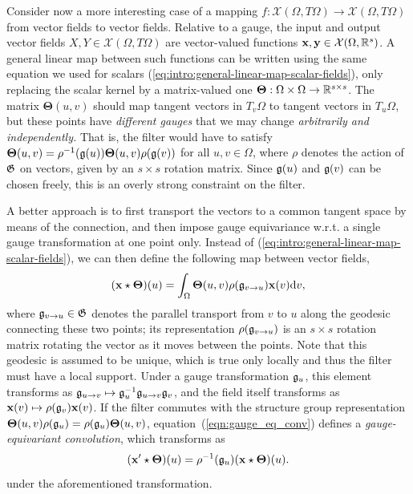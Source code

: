 Consider now a more interesting case of a mapping $f : \mathcal{X}(\Omega, T\Omega) \rightarrow \mathcal{X}(\Omega, T\Omega)$ from vector fields to vector fields. 
%
Relative to a gauge, the input and output vector fields $X, Y \in \mathcal{X}(\Omega, T\Omega)$ are vector-valued functions $\mathbf{x}, \mathbf{y} \in \mathcal{X}(\Omega, \mathbb{R}^s)$. 
%
A general linear map between such functions can be written using the same equation we used for scalars  (\ref{eq:intro:general-linear-map-scalar-fields}), only replacing the scalar kernel by a matrix-valued one $\boldsymbol{\Theta} : \Omega \times \Omega \rightarrow \mathbb{R}^{s \times s}$.
%
The matrix $\boldsymbol{\Theta} (u, v)$ should map tangent vectors in $T_v\Omega$ to tangent vectors in $T_u\Omega$, but these points have {\em different gauges} that we may change {\em arbitrarily and independently.} 
%
 That is, the filter would have to satisfy $\boldsymbol{\Theta} (u, v) = \rho^{-1}({\mathfrak{g}}(u)) \boldsymbol{\Theta}(u, v) \rho({\mathfrak{g}}(v))$ for all $u, v \in \Omega$, where $\rho$ denotes the action of ${\mathfrak{G}}$ on vectors, given by an $s\times s$ rotation matrix. 
Since ${\mathfrak{g}}(u)$ and ${\mathfrak{g}}(v)$ can be chosen freely, this is an overly strong constraint on the filter. 


A better approach is to first transport the vectors to a common tangent space by means of the connection,  and then impose gauge equivariance w.r.t. a single gauge transformation at one point only. 
Instead of (\ref{eq:intro:general-linear-map-scalar-fields}), we can then define the following map between vector fields,
\begin{equation}
    (\mathbf{x} \star \boldsymbol{\Theta})(u) = \int_\Omega \boldsymbol{\Theta}(u, v) \rho({\mathfrak{g}}_{v \rightarrow u}) \mathbf{x}(v) \mathrm{d}v,\label{eqn:gauge_eq_conv}
\end{equation}
where ${\mathfrak{g}}_{v \rightarrow u} \in {\mathfrak{G}}$ denotes the parallel transport from $v$ to $u$ along the geodesic connecting these two points;  
%
its representation $\rho({\mathfrak{g}}_{v \rightarrow u})$ is an $s \times s$ rotation matrix rotating the vector as it moves between the points. 
%
Note that this geodesic is assumed to be unique, which is true only locally and thus the filter must have a local support. 
%
%
Under a gauge transformation ${\mathfrak{g}}_u$, this element transforms as ${\mathfrak{g}}_{u \rightarrow v} \mapsto {\mathfrak{g}}_u^{-1} {\mathfrak{g}}_{u \rightarrow v} {\mathfrak{g}}_v$, and the field itself transforms as $\mathbf{x}(v) \mapsto \rho({\mathfrak{g}}_v) \mathbf{x}(v)$. 
If the filter commutes with the structure group representation  $\boldsymbol{\Theta}(u, v) \rho({\mathfrak{g}}_u) = \rho({\mathfrak{g}}_u) \boldsymbol{\Theta}(u, v)$, %
equation~(\ref{eqn:gauge_eq_conv}) defines a {\em gauge-equivariant convolution}, which transforms as  
$$ 
(\mathbf{x}' \star \boldsymbol{\Theta})(u) = \rho^{-1}({\mathfrak{g}}_u) (\mathbf{x} \star \boldsymbol{\Theta})(u). 
$$ 
under the aforementioned transformation. %

